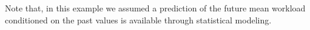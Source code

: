 

Note that, in this example we assumed a prediction of the future mean workload conditioned on the past values is available through statistical modeling. 

